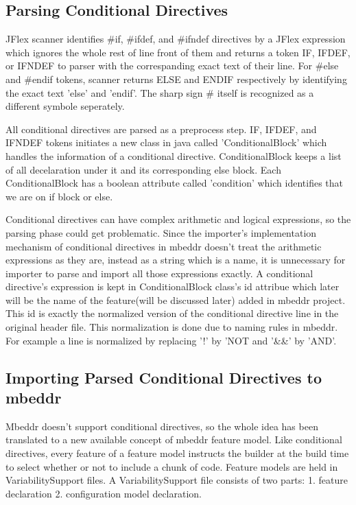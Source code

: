\documentclass[titlepage]{article}
\begin{document}
\subsection{Parsing Conditional Directives}
JFlex scanner identifies \#if, \#ifdef, and \#ifndef directives by a JFlex expression which ignores the whole rest of line front of them and returns a token IF, IFDEF, or IFNDEF to parser with the correspanding exact text of their line. For \#else and \#endif tokens, scanner returns ELSE and ENDIF respectively by identifying the exact text 'else' and 'endif'. The sharp sign \# itself is recognized as a different symbole seperately.

All conditional directives are parsed as a preprocess step. IF, IFDEF, and IFNDEF tokens initiates a new class in java called 'ConditionalBlock' which handles the information of a conditional directive. ConditionalBlock keeps a list of all decelaration under it and its corresponding else block. Each ConditionalBlock has a boolean attribute called 'condition' which identifies that we are on if block or else.

Conditional directives can have complex arithmetic and logical expressions, so the parsing phase could get problematic. Since the importer's implementation mechanism of conditional directives in mbeddr doesn't treat the arithmetic expressions as they are, instead as a string which is a name, it is unnecessary for importer to parse and import all those expressions exactly. A conditional directive's expression is kept in ConditionalBlock class's id attribue which later will be the name of the feature(will be discussed later) added in mbeddr project. This id is exactly the normalized version of the conditional directive line in the original header file. This normalization is done due to naming rules in mbeddr. For example a line is normalized by replacing '!' by 'NOT and '\&\&' by 'AND'.

\subsection{Importing Parsed Conditional Directives to mbeddr}
Mbeddr doesn't support conditional directives, so the whole idea has been translated to a new available concept of mbeddr feature model. Like conditional directives, every feature of a feature model instructs the builder at the build time to select whether or not to include a chunk of code. Feature models are held in VariabilitySupport files. A VariabilitySupport file consists of two parts: 1. feature declaration 2. configuration model declaration.
 
\end{document}

